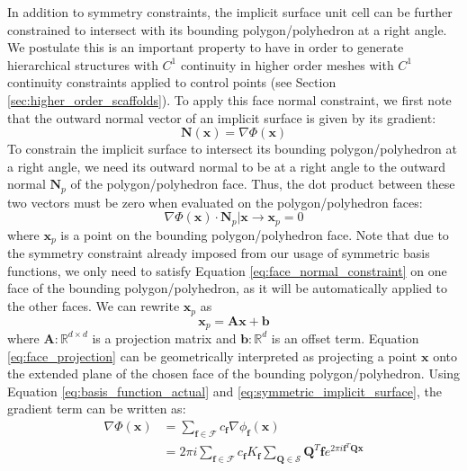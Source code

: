 \documentclass[acmtog]{acmart}
\begin{document}
In addition to symmetry constraints, the implicit surface unit cell can be further constrained to intersect with its bounding polygon/polyhedron at a right angle. We postulate this is an important property to have in order to generate hierarchical structures with $C^1$ continuity in higher order meshes with $C^1$ continuity constraints applied to control points (see Section \ref{sec:higher_order_scaffolds}). To apply this face normal constraint, we first note that the outward normal vector of an implicit surface is given by its gradient:
%
\begin{equation}
  \mathbf{N}(\mathbf{x}) = \nabla \Phi(\mathbf{x})
\end{equation}
%
To constrain the implicit surface to intersect its bounding polygon/polyhedron at a right angle, we need its outward normal to be at a right angle to the outward normal $\mathbf{N}_p$ of the polygon/polyhedron face. Thus, the dot product between these two vectors must be zero when evaluated on the polygon/polyhedron faces:
%
\begin{equation}
  \label{eq:face_normal_constraint}
  \nabla \Phi(\mathbf{x}) \cdot \mathbf{N}_p \rvert \mathbf{x} \rightarrow \mathbf{x}_p = 0
\end{equation}
%
where $\mathbf{x}_p$ is a point on the bounding polygon/polyhedron face. Note that due to the symmetry constraint already imposed from our usage of symmetric basis functions, we only need to satisfy Equation \ref{eq:face_normal_constraint} on one face of the bounding polygon/polyhedron, as it will be automatically applied to the other faces. We can rewrite $\mathbf{x}_p$ as
%
\begin{equation}
  \label{eq:face_projection}
  \mathbf{x}_p = \mathbf{A} \mathbf{x} + \mathbf{b}
\end{equation}
%
where $\mathbf{A} : \mathbb{R}^{d \times d}$ is a projection matrix and $\mathbf{b} : \mathbb{R}^d $ is an offset term. Equation \ref{eq:face_projection} can be geometrically interpreted as projecting a point $\mathbf{x}$ onto the extended plane of the chosen face of the bounding polygon/polyhedron. Using Equation \ref{eq:basis_function_actual} and \ref{eq:symmetric_implicit_surface}, the gradient term can be written as:
%
\begin{equation}
  \begin{split}
    \nabla \Phi(\mathbf{x}) &= \sum\limits_{\mathbf{f} \in \mathcal{F}} c_{\mathbf{f}} \nabla \phi_{\mathbf{f}}(\mathbf{x}) \\
    &= 2 \pi i \sum\limits_{\mathbf{f} \in \mathcal{F}} c_{\mathbf{f}} K_{\mathbf{f}} \sum\limits_{\mathbf{Q} \in \mathcal{S}} \mathbf{Q}^T \mathbf{f} e^{2 \pi i \mathbf{f}^T \mathbf{Q} \mathbf{x}}
  \end{split}
\end{equation}
%
\end{document}

